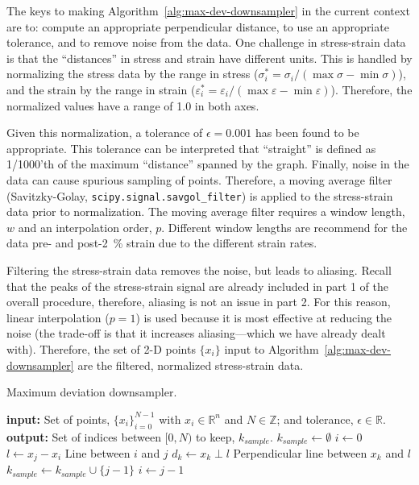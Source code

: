 \documentclass[a4paper,11pt]{article}
\begin{document}
The keys to making Algorithm~\ref{alg:max-dev-downsampler} in the current context are to: compute an appropriate perpendicular distance, to use an appropriate tolerance, and to remove noise from the data.
One challenge in stress-strain data is that the ``distances'' in stress and strain have different units.
This is handled by normalizing the stress data by the range in stress ($\sigma_i^* = \sigma_i / (\max \sigma - \min \sigma)$), and the strain by the range in strain ($\varepsilon_i^* = \varepsilon_i / (\max \varepsilon - \min \varepsilon)$).
Therefore, the normalized values have a range of 1.0 in both axes.

Given this normalization, a tolerance of $\epsilon = 0.001$ has been found to be appropriate.
This tolerance can be interpreted that ``straight'' is defined as 1/1000'th of the maximum ``distance'' spanned by the graph.
Finally, noise in the data can cause spurious sampling of points.
Therefore, a moving average filter (Savitzky-Golay, \texttt{scipy.signal.savgol\_filter}) is applied to the stress-strain data prior to normalization.
The moving average filter requires a window length, $w$ and an interpolation order, $p$.
Different window lengths are recommend for the data pre- and post-2~\% strain due to the different strain rates.

Filtering the stress-strain data removes the noise, but leads to aliasing.
Recall that the peaks of the stress-strain signal are already included in part 1 of the overall procedure, therefore, aliasing is not an issue in part 2.
For this reason, linear interpolation ($p = 1$) is used because it is most effective at reducing the noise (the trade-off is that it increases aliasing---which we have already dealt with).
Therefore, the set of 2-D points $\{x_i\}$ input to Algorithm~\ref{alg:max-dev-downsampler} are the filtered, normalized stress-strain data.

\begin{algorithm}
	\caption{Maximum deviation downsampler.}
	\label{alg:max-dev-downsampler}
	\begin{algorithmic}[1]
		\State \textbf{input:} Set of points, $\{x_i\}_{i=0}^{N-1}$ with $x_i \in \mathbb{R}^n$ and $N \in \mathbb{Z}$; and tolerance, $\epsilon \in \mathbb{R}$.
        \State \textbf{output:} Set of indices between $[0, N)$ to keep, $k_{sample}$.
        \State $k_{sample} \gets \emptyset$
        \State $i \gets 0$
			\State $l \gets x_j - x_i$
            \Comment Line between $i$ and $j$
                \State $d_k \gets x_k \perp l$
                \Comment Perpendicular line between $x_k$ and $l$
            \EndFor
                \State $k_{sample} \gets k_{sample} \cup \{j - 1 \}$
                \State $i \gets j - 1$
            \EndIf
		\EndFor
\end{algorithmic}
\end{algorithm}
\end{document}
